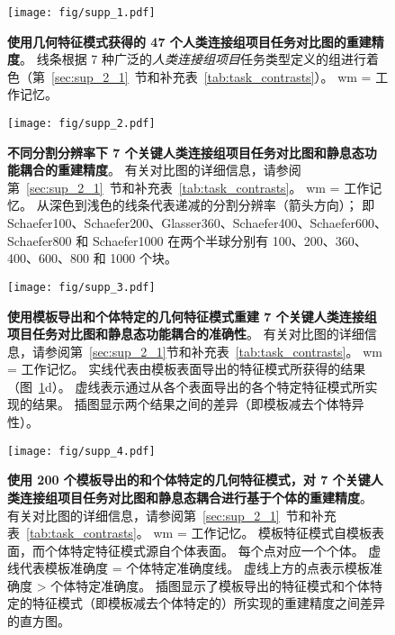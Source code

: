 \documentclass[lang=cn,a4paper,newtx,citestyle=gb7714-2015, bibstyle=gb7714-2015]{elegantpaper}
\begin{document}
\begin{figure}[!htb] 
	\centering
	\texttt{[image: fig/supp\_1.pdf]}
	\caption{\textbf{使用几何特征模式获得的 47 个人类连接组项目任务对比图的重建精度}。
	线条根据 7 种广泛的\textit{人类连接组项目}任务类型定义的组进行着色（第~\ref{sec:sup_2_1}~节和补充表~\ref{tab:task_contrasts}）。 wm = 工作记忆。} \label{fig:supp_1}
\end{figure}



\begin{figure}[!htb] 
	\centering
	\texttt{[image: fig/supp\_2.pdf]}
	\caption{\textbf{不同分割分辨率下 7 个关键人类连接组项目任务对比图和静息态功能耦合的重建精度}。 
	有关对比图的详细信息，请参阅第~\ref{sec:sup_2_1}~节和补充表~\ref{tab:task_contrasts}。
	wm = 工作记忆。
	从深色到浅色的线条代表递减的分割分辨率（箭头方向）；
	即Schaefer100、Schaefer200、Glasser360、Schaefer400、Schaefer600、Schaefer800 和 Schaefer1000 在两个半球分别有 100、200、360、400、600、800 和 1000 个块。} \label{fig:supp_2}
\end{figure}



\begin{figure}[!htb] 
	\centering
	\texttt{[image: fig/supp\_3.pdf]}
	\caption{\textbf{使用模板导出和个体特定的几何特征模式重建 7 个关键人类连接组项目任务对比图和静息态功能耦合的准确性}。
	有关对比图的详细信息，请参阅第~\ref{sec:sup_2_1}节和补充表~\ref{tab:task_contrasts}。 
	wm = 工作记忆。
	实线代表由模板表面导出的特征模式所获得的结果（图~\ref{fig:supp_1}d）。
	虚线表示通过从各个表面导出的各个特定特征模式所实现的结果。
	插图显示两个结果之间的差异（即模板减去个体特异性）。} \label{fig:supp_3}
\end{figure}




\begin{figure}[!htb] 
	\centering
	\texttt{[image: fig/supp\_4.pdf]}
	\caption{\textbf{使用 200 个模板导出的和个体特定的几何特征模式，对 7 个关键人类连接组项目任务对比图和静息态耦合进行基于个体的重建精度}。
	有关对比图的详细信息，请参阅第~\ref{sec:sup_2_1}~节和补充表~\ref{tab:task_contrasts}。
	wm = 工作记忆。
	模板特征模式自模板表面，而个体特定特征模式源自个体表面。
	每个点对应一个个体。
	虚线代表模板准确度 = 个体特定准确度线。
	虚线上方的点表示模板准确度 > 个体特定准确度。
	插图显示了模板导出的特征模式和个体特定的特征模式（即模板减去个体特定的）所实现的重建精度之间差异的直方图。} \label{fig:supp_4}
\end{figure}
\end{document}
